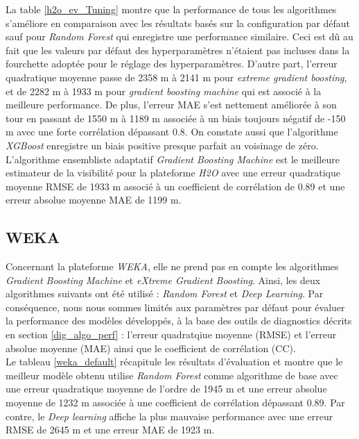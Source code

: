La table \ref{h2o_ev_Tuning} montre que la performance de tous les algorithmes s'améliore en comparaison avec les résultats basés sur la configuration par défaut sauf pour \textit{Random Forest} qui enregistre une performance similaire. Ceci est dû au fait que les valeurs par défaut des hyperparamètres n'étaient pas incluses dans la fourchette adoptée pour le réglage des hyperparamètres. D'autre part, l'erreur quadratique moyenne passe de 2358 m à 2141 m pour \textit{extreme gradient boosting}, et de 2282 m à 1933 m pour \textit{gradient boosting machine} qui est associé à la meilleure performance. De plus, l'erreur MAE s'est nettement améliorée à son tour en passant de 1550 m à 1189 m associée à un biais toujours négatif de -150 m avec une forte corrélation dépassant 0.8. On constate aussi que l'algorithme \textit{XGBoost} enregistre un biais positive presque parfait au voisinage de zéro.\\

 L'algorithme ensembliste adaptatif \textit{Gradient Boosting Machine}  est le meilleure estimateur de la visibilité pour la plateforme \textit{H2O} avec une erreur quadratique moyenne RMSE de 1933 m associé à un coefficient de corrélation de 0.89 et une erreur absolue moyenne MAE de 1199 m.  

\subsection*{WEKA}
Concernant la plateforme \textit{WEKA}, elle ne prend pas en compte les algorithmes \textit{Gradient Boosting Machine} et \textit{eXtreme Gradient Boosting}. Ainsi, les deux algorithmes suivants ont été utilisé : \textit{Random Forest} et \textit{Deep Learning}. Par conséquence, nous nous sommes limités aux paramètres par défaut pour évaluer la performance des modèles développés, à la base des outils de diagnostics décrits en section \ref{dig_algo_perf} :  l'erreur quadratqiue moyenne (RMSE) et l'erreur absolue moyenne (MAE) ainsi que le coefficient de corrélation (CC).\\ 

Le tableau \ref{weka_default} récapitule les résultats d'évaluation et montre que le meilleur modèle obtenu utilise \textit{Random Forest} comme algorithme de base avec une erreur quadratique moyenne de l'ordre de 1945 m et une erreur absolue moyenne de 1232 m associée à une coefficient de corrélation dépassant 0.89. Par contre, le \textit{Deep learning} affiche la plus mauvaise performance avec une erreur RMSE de 2645 m et une erreur MAE de 1923 m. 

